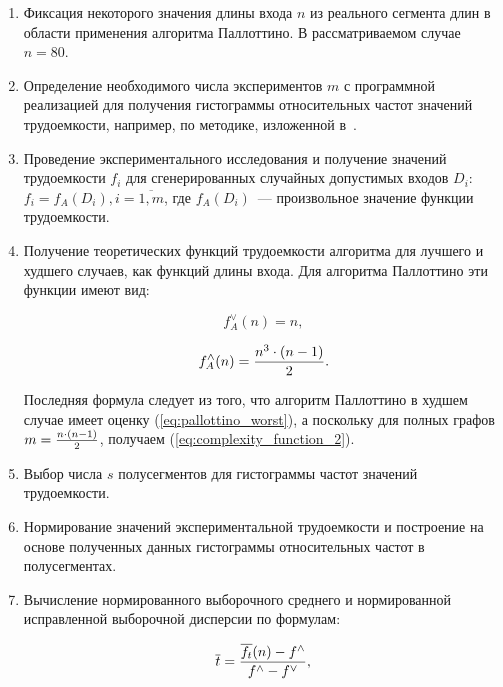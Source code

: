 \documentclass[a4paper,fontsize=14pt]{article}
\begin{document}
\begin{enumerate}
	\item Фиксация некоторого значения длины входа $n$ из реального сегмента длин в области применения алгоритма Паллоттино. В рассматриваемом случае $n = 80$.
	
	\item Определение необходимого числа экспериментов $m$ с программной реализацией для получения гистограммы относительных частот значений трудоемкости, например, по методике, изложенной в~\cite{petrushyn_ulyanov_planning}.
	
	\item Проведение экспериментального исследования и получение значений трудоемкости $f_i$ для сгенерированных случайных допустимых входов $D_i$: $f_i = f_A(D_i), i = \overline{1, m}$, где $f_A(D_i)$~--- произвольное значение функции трудоемкости.
	
	\item Получение теоретических функций трудоемкости алгоритма для лучшего и худшего случаев, как функций длины входа. Для алгоритма Паллоттино эти функции имеют вид:
	
	\begin{equation}\label{eq:complexity_function_1}
	f_A^\vee(n) = n,
	\end{equation}
	
	\begin{equation}\label{eq:complexity_function_2}
	f_A^\wedge(n) = {n^3 \cdot (n - 1) \over{2}}.
	\end{equation}
	
	Последняя формула следует из того, что алгоритм Паллоттино в худшем случае имеет оценку (\ref{eq:pallottino_worst}), а поскольку для полных графов \\ $m = {n \cdot (n - 1) \over{2}}$, получаем (\ref{eq:complexity_function_2}).
	
	\item Выбор числа $s$ полусегментов для гистограммы частот значений трудоемкости.
	
	\item Нормирование значений экспериментальной трудоемкости и построение на основе полученных данных гистограммы относительных частот в полусегментах.
	
	\item Вычисление нормированного выборочного среднего и нормированной исправленной выборочной дисперсии по формулам:
	
	\begin{equation}\label{eq:mean}
	\overline{t} = {\overline{f_t}(n) - f^\wedge \over{f^\wedge - f^\vee}},
	\end{equation}
	

\end{enumerate}
\end{document}
